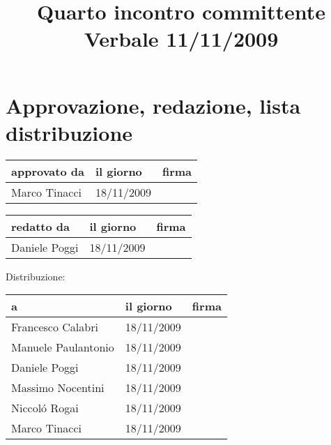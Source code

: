 \documentclass[a4paper, 12pt]{report}
\title{Quarto incontro committente \\Verbale 11/11/2009}
\date{11/11/2009 \\Firenze \\\begin{figure}[h] \centering \texttt{[image: ../../../../images/logokiwi.png]} \end{figure} }
\begin{document}
\maketitle

\newpage

\section*{Approvazione, redazione, lista distribuzione}
\begin{table}[h!]
  \begin{center}
    \begin{tabular}{| l | l | p{60mm} |}
    \hline
    \textbf{approvato da} & \textbf{il giorno} & \textbf{firma} \\
	\hline    
	Marco Tinacci & 18/11/2009 &  \\
    \hline
    \end{tabular}
  \end{center}
\end{table}

\begin{table}[h!]
  \begin{center}
    \begin{tabular}{| l | l | p{60mm} |}
    \hline
    \textbf{redatto da} & \textbf{il giorno} & \textbf{firma} \\
	\hline    
	Daniele Poggi & 18/11/2009 &  \\
    \hline
    \end{tabular}
  \end{center}
\end{table}

Distribuzione:
\begin{table}[h!]
  \begin{center}
    \begin{tabular}{| l | l | p{60mm} |}
    \hline
    \textbf{a} & \textbf{il giorno} & \textbf{firma} \\
	\hline    
	Francesco Calabri & 18/11/2009 &  \\
    \hline
	Manuele Paulantonio & 18/11/2009 &  \\
    \hline
	Daniele Poggi & 18/11/2009 &  \\
    \hline
	Massimo Nocentini & 18/11/2009 &  \\
    \hline
	Niccol\'o Rogai & 18/11/2009 &  \\
    \hline
	Marco Tinacci & 18/11/2009 &  \\
    \hline
    \end{tabular}
  \end{center}
\end{table}

\newpage


\end{document}
